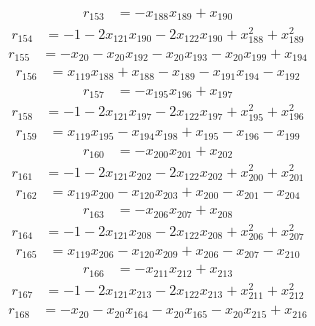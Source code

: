 \begin{align*}
r_{153}&=
-x_{188}x_{189}+x_{190}
\end{align*}
\begin{align*}
r_{154}&=
-1-2x_{121}x_{190}-2x_{122}x_{190}+x_{188}^{2}+x_{189}^{2}
\end{align*}
\begin{align*}
r_{155}&=
-x_{20}-x_{20}x_{192}-x_{20}x_{193}-x_{20}x_{199}+x_{194}
\end{align*}
\begin{align*}
r_{156}&=
x_{119}x_{188}+x_{188}-x_{189}-x_{191}x_{194}-x_{192}
\end{align*}
\begin{align*}
r_{157}&=
-x_{195}x_{196}+x_{197}
\end{align*}
\begin{align*}
r_{158}&=
-1-2x_{121}x_{197}-2x_{122}x_{197}+x_{195}^{2}+x_{196}^{2}
\end{align*}
\begin{align*}
r_{159}&=
x_{119}x_{195}-x_{194}x_{198}+x_{195}-x_{196}-x_{199}
\end{align*}
\begin{align*}
r_{160}&=
-x_{200}x_{201}+x_{202}
\end{align*}
\begin{align*}
r_{161}&=
-1-2x_{121}x_{202}-2x_{122}x_{202}+x_{200}^{2}+x_{201}^{2}
\end{align*}
\begin{align*}
r_{162}&=
x_{119}x_{200}-x_{120}x_{203}+x_{200}-x_{201}-x_{204}
\end{align*}
\begin{align*}
r_{163}&=
-x_{206}x_{207}+x_{208}
\end{align*}
\begin{align*}
r_{164}&=
-1-2x_{121}x_{208}-2x_{122}x_{208}+x_{206}^{2}+x_{207}^{2}
\end{align*}
\begin{align*}
r_{165}&=
x_{119}x_{206}-x_{120}x_{209}+x_{206}-x_{207}-x_{210}
\end{align*}
\begin{align*}
r_{166}&=
-x_{211}x_{212}+x_{213}
\end{align*}
\begin{align*}
r_{167}&=
-1-2x_{121}x_{213}-2x_{122}x_{213}+x_{211}^{2}+x_{212}^{2}
\end{align*}
\begin{align*}
r_{168}&=
-x_{20}-x_{20}x_{164}-x_{20}x_{165}-x_{20}x_{215}+x_{216}
\end{align*}
